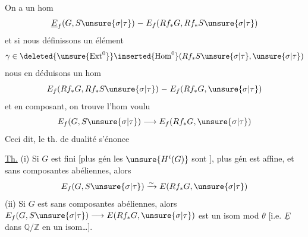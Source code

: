 On a un hom 
\[
\underline E_f(G,S\unsure{\sigma|\tau})\mathrel{-}E_f(Rf_*G,Rf_*S\unsure{\sigma|\tau})
\]
et si nous définissons un élément
\[
\gamma\in\deleted{\unsure{\operatorname{Ext}^0}}\inserted{\operatorname{Hom}^0}(Rf_*S\unsure{\sigma|\tau},\unsure{\sigma|\tau})
\]
nous en déduisons un  hom
\[
E_f(Rf_*G,Rf_*S\unsure{\sigma|\tau})\mathrel{-}E_f(Rf_*G,\unsure{\sigma|\tau})
\]
et en composant, on trouve l'hom voulu
\[
E_f(G,S\unsure{\sigma|\tau})\longrightarrow E_f(Rf_*G,\unsure{\sigma|\tau})
\]
Ceci dit, le th. de dualité s'énonce

\uline{Th.} (i) Si $G$ est  fini [plus gén les $\unsure{H^i(G)}$ sont ],  plus gén est affine, et sans composantes abéliennes, alors
\[
E_f(G,S\unsure{\sigma|\tau})\xrightarrow{\sim}E(Rf_*G,\unsure{\sigma|\tau})
\]
(ii) Si $G$ est  sans composantes abéliennes, alors $E_f(G,S\unsure{\sigma|\tau})\longrightarrow E(Rf_*G,\unsure{\sigma|\tau})$ est un isom mod $\theta$ [i.e.  $\underline E$ dans $\mathbb Q/\mathbb Z$   en un isom\ldots].

